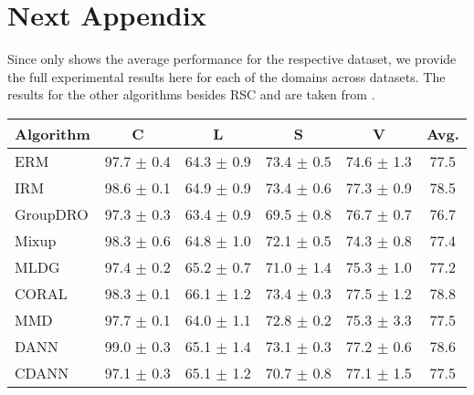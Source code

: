 
\chapter{Next Appendix} %
\label{AppendixB} 

Since  only shows the average performance for the respective dataset, we provide the full experimental results here for each of the domains across datasets. The results for the other algorithms besides \textsc{RSC} and \divcam are taken from \domainbed \cite{huang2020selfchallenging}.

\begin{table*}
\begin{center}
\begin{tabular}{lccccc}
\toprule
\textbf{Algorithm}   & \textbf{C}           & \textbf{L}           & \textbf{S}           & \textbf{V}           & \textbf{Avg.}         \\
\midrule
ERM                  & 97.7 $\pm$ 0.4       & 64.3 $\pm$ 0.9       & 73.4 $\pm$ 0.5       & 74.6 $\pm$ 1.3       & 77.5                 \\
IRM                  & 98.6 $\pm$ 0.1       & 64.9 $\pm$ 0.9       & 73.4 $\pm$ 0.6       & 77.3 $\pm$ 0.9       & 78.5                 \\
GroupDRO             & 97.3 $\pm$ 0.3       & 63.4 $\pm$ 0.9       & 69.5 $\pm$ 0.8       & 76.7 $\pm$ 0.7       & 76.7                 \\
Mixup                & 98.3 $\pm$ 0.6       & 64.8 $\pm$ 1.0       & 72.1 $\pm$ 0.5       & 74.3 $\pm$ 0.8       & 77.4                 \\
MLDG                 & 97.4 $\pm$ 0.2       & 65.2 $\pm$ 0.7       & 71.0 $\pm$ 1.4       & 75.3 $\pm$ 1.0       & 77.2                 \\
CORAL                & 98.3 $\pm$ 0.1       & 66.1 $\pm$ 1.2       & 73.4 $\pm$ 0.3       & 77.5 $\pm$ 1.2       & 78.8                 \\
MMD                  & 97.7 $\pm$ 0.1       & 64.0 $\pm$ 1.1       & 72.8 $\pm$ 0.2       & 75.3 $\pm$ 3.3       & 77.5                 \\
DANN                 & 99.0 $\pm$ 0.3       & 65.1 $\pm$ 1.4       & 73.1 $\pm$ 0.3       & 77.2 $\pm$ 0.6       & 78.6                 \\
CDANN                & 97.1 $\pm$ 0.3       & 65.1 $\pm$ 1.2       & 70.7 $\pm$ 0.8       & 77.1 $\pm$ 1.5       & 77.5                 \\

\end{tabular}
\end{center}
\end{table*}
